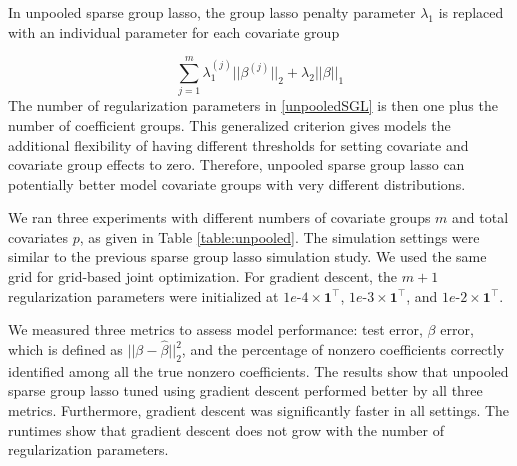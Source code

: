 \documentclass[10pt,letterpaper]{article}
\begin{document}
In unpooled sparse group lasso, the group lasso penalty parameter $\lambda_1$ is replaced with an individual parameter for each covariate group

\begin{equation}
\sum_{j=1}^m \lambda_1^{(j)} \lvert\lvert \beta^{(j)} \rvert \rvert_2
+ \lambda_2 \lvert\lvert \beta \rvert \rvert_1
\label{unpooledSGL}
\end{equation}
The number of regularization parameters in \eqref{unpooledSGL} is then one plus the number of coefficient groups. This generalized criterion gives models the additional flexibility of having different thresholds for setting covariate and covariate group effects to zero. Therefore, unpooled sparse group lasso can potentially better model covariate groups with very different distributions.

We ran three experiments with different numbers of covariate groups $m$ and total covariates $p$, as given in Table \ref{table:unpooled}. The simulation settings were similar to the previous sparse group lasso simulation study. We used the same grid for grid-based joint optimization. For gradient descent, the $m+1$ regularization parameters were initialized at $1e\text{-}4 \times \boldsymbol 1^\top$, $1e\text{-}3 \times \boldsymbol 1^\top$, and $1e\text{-}2 \times \boldsymbol 1^\top$.

We measured three metrics to assess model performance: test error, $\beta$ error, which is defined as $\lvert \lvert \beta - \hat \beta \rvert \rvert_2 ^2$, and the percentage of nonzero coefficients correctly identified among all the true nonzero coefficients. The results show that unpooled sparse group lasso tuned using gradient descent performed better by all three metrics. Furthermore, gradient descent was significantly faster in all settings. The runtimes show that gradient descent does not grow with the number of regularization parameters.
\end{document}
